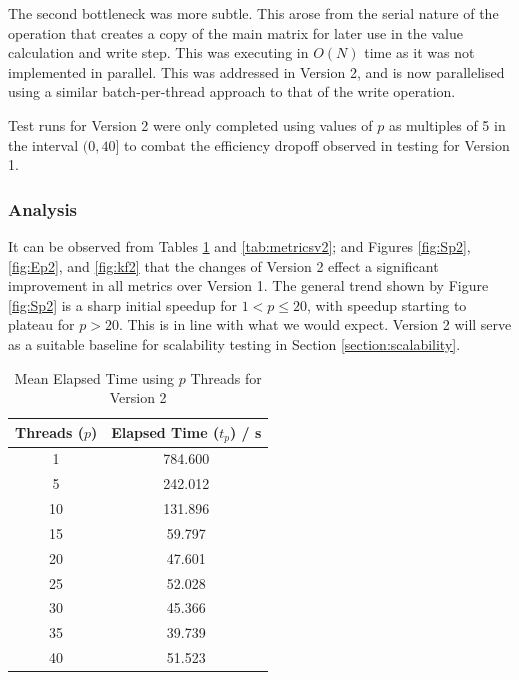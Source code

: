 The second bottleneck was more subtle. This arose from the serial nature of the operation that creates a copy of the main matrix for later use in the value calculation and write step. This was executing in $O(N)$ time as it was not implemented in parallel. This was addressed in Version 2, and is now parallelised using a similar batch-per-thread approach to that of the write operation.

Test runs for Version 2 were only completed using values of $p$ as multiples of 5 in the interval $(0, 40]$ to combat the efficiency dropoff observed in testing for Version 1.

\subsubsection{Analysis}

It can be observed from Tables \ref{tab:timev2} and \ref{tab:metricsv2}; and Figures \ref{fig:Sp2}, \ref{fig:Ep2}, and \ref{fig:kf2} that the changes of Version 2 effect a significant improvement in all metrics over Version 1. The general trend shown by Figure \ref{fig:Sp2} is a sharp initial speedup for $1<p\leq20$, with speedup starting to plateau for $p>20$. This is in line with what we would expect. Version 2 will serve as a suitable baseline for scalability testing in Section \ref{section:scalability}.


\begin{table}[H]
    \centering
    \begin{tabular}{cc}
    \textbf{Threads ($p$)} & \textbf{Elapsed Time ($t_p$) / s} \\ \hline
    1                      & 784.600                           \\
    5                      & 242.012                           \\
    10                     & 131.896                           \\
    15                     & 59.797                            \\
    20                     & 47.601                            \\
    25                     & 52.028                            \\
    30                     & 45.366                            \\
    35                     & 39.739                            \\
    40                     & 51.523                           
    \end{tabular}
    \caption{Mean Elapsed Time using $p$ Threads for Version 2}
    \label{tab:timev2}
\end{table}

